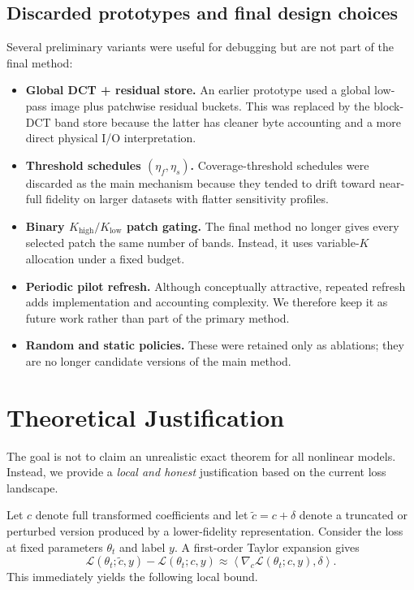 \documentclass[10pt,twocolumn]{article}
\newcommand{\Lagr}{\mathcal{L}}
\begin{document}
\subsection{Discarded prototypes and final design choices}
Several preliminary variants were useful for debugging but are not part of the final method:
\begin{itemize}
    \item \textbf{Global DCT + residual store.} An earlier prototype used a global low-pass image plus patchwise residual buckets. This was replaced by the block-DCT band store because the latter has cleaner byte accounting and a more direct physical I/O interpretation.
    \item \textbf{Threshold schedules $(\eta_f,\eta_s)$.} Coverage-threshold schedules were discarded as the main mechanism because they tended to drift toward near-full fidelity on larger datasets with flatter sensitivity profiles.
    \item \textbf{Binary $K_{\mathrm{high}}/K_{\mathrm{low}}$ patch gating.} The final method no longer gives every selected patch the same number of bands. Instead, it uses variable-$K$ allocation under a fixed budget.
    \item \textbf{Periodic pilot refresh.} Although conceptually attractive, repeated refresh adds implementation and accounting complexity. We therefore keep it as future work rather than part of the primary method.
    \item \textbf{Random and static policies.} These were retained only as ablations; they are no longer candidate versions of the main method.
\end{itemize}

\section{Theoretical Justification}
The goal is not to claim an unrealistic exact theorem for all nonlinear models. Instead, we provide a \emph{local and honest} justification based on the current loss landscape.

Let $c$ denote full transformed coefficients and let $\tilde c = c + \delta$ denote a truncated or perturbed version produced by a lower-fidelity representation. Consider the loss at fixed parameters $\theta_t$ and label $y$. A first-order Taylor expansion gives
\begin{equation}
    \Lagr(\theta_t; \tilde c, y) - \Lagr(\theta_t; c, y)
    \approx \left\langle \nabla_c \Lagr(\theta_t; c, y), \delta \right\rangle.
\end{equation}
This immediately yields the following local bound.
\end{document}
